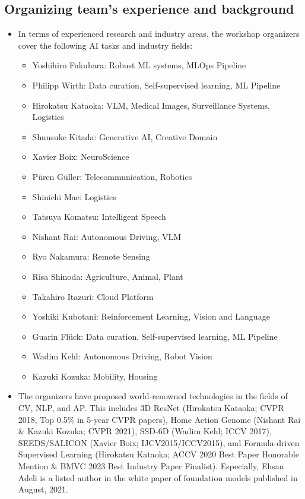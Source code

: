\documentclass{article}
\begin{document}
\subsection{Organizing team's experience and background}
\begin{itemize}
    \item In terms of experienced research and industry areas, the workshop organizers cover the following AI tasks and industry fields:

    \begin{itemize}
        \item Yoshihiro Fukuhara: Robust ML systems, MLOps Pipeline
        \item Philipp Wirth: Data curation, Self-supervised learning, ML Pipeline
        \item Hirokatsu Kataoka: VLM, Medical Images, Surveillance Systems, Logistics
        \item Shunsuke Kitada: Generative AI, Creative Domain
        \item Xavier Boix: NeuroScience
        \item Püren Güller: Telecommunication, Robotics
        \item Shinichi Mae: Logistics
        \item Tatsuya Komatsu: Intelligent Speech
        \item Nishant Rai: Autonomous Driving, VLM
        \item Ryo Nakamura: Remote Sensing
        \item Risa Shinoda: Agriculture, Animal, Plant
        \item Takahiro Itazuri: Cloud Platform
        \item Yoshiki Kubotani: Reinforcement Learning, Vision and Language
        \item Guarin Flück: Data curation, Self-supervised learning, ML Pipeline
        \item Wadim Kehl: Autonomous Driving, Robot Vision
        \item Kazuki Kozuka: Mobility, Housing
    \end{itemize}

    \item The organizers have proposed world-renowned technologies in the fields of CV, NLP, and AP. This includes 3D ResNet (Hirokatsu Kataoka; CVPR 2018, Top 0.5\% in 5-year CVPR papers), Home Action Genome (Nishant Rai \& Kazuki Kozuka; CVPR 2021), SSD-6D (Wadim Kehl; ICCV 2017), SEEDS/SALICON (Xavier Boix; IJCV2015/ICCV2015), and Formula-driven Supervised Learning (Hirokatsu Kataoka; ACCV 2020 Best Paper Honorable Mention \& BMVC 2023 Best Industry Paper Finalist). Especially, Ehsan Adeli is a listed author in the white paper of foundation models published in August, 2021.


\end{itemize}
\end{document}
